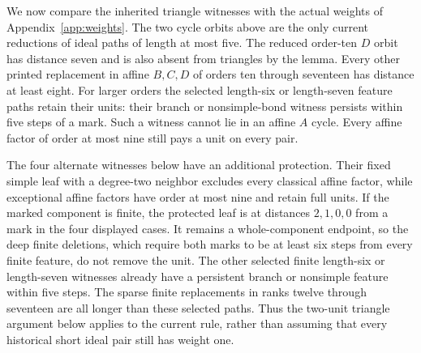 We now compare the inherited triangle witnesses with the actual weights
of Appendix~\ref{app:weights}. The two cycle orbits above are the only
current reductions of ideal paths of length at most five. The reduced
order-ten $D$ orbit has distance seven and is also absent from
triangles by the lemma. Every other printed replacement in affine
$B,C,D$ of orders ten through seventeen has distance at least eight.
For larger orders the selected length-six or length-seven feature
paths retain their units: their branch or nonsimple-bond witness
persists within five steps of a mark. Such a witness cannot lie in
an affine $A$ cycle. Every affine factor of order at most nine still
pays a unit on every pair.

The four alternate witnesses below have an additional protection.
Their fixed simple leaf with a degree-two neighbor excludes every
classical affine factor, while exceptional affine factors have order
at most nine and retain full units. If the marked component is
finite, the protected leaf is at distances $2,1,0,0$ from a mark
in the four displayed cases. It remains a whole-component endpoint,
so the deep finite deletions, which require both marks to be at
least six steps from every finite feature, do not remove the unit.
The other selected finite length-six or length-seven witnesses
already have a persistent branch or nonsimple feature within five
steps. The sparse finite replacements in ranks twelve through
seventeen are all longer than these selected paths. Thus the
two-unit triangle argument below applies to the current rule,
rather than assuming that every historical short ideal pair
still has weight one.
